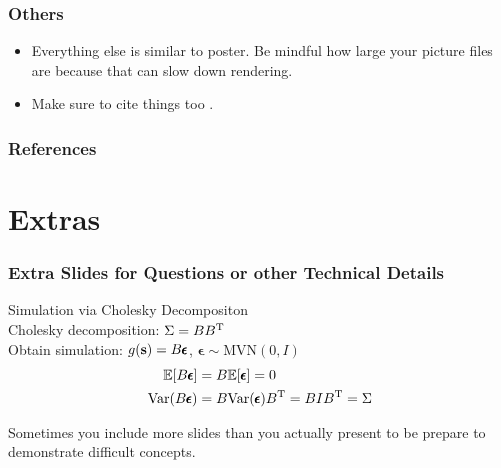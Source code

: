 \documentclass[serif,12pt, aspectratio=169]{beamer}
\begin{document}
\begin{frame}
	\frametitle{Others}
	\begin{itemize}
		\item Everything else is similar to poster. Be mindful how large your picture files are because that can slow down rendering. 
		\item Make sure to cite things too \cite{PlaceHolderSource}.
	\end{itemize}
	
	
	
\end{frame}


\begin{frame}
\frametitle{References}
	\AtNextBibliography{\tiny}
	\printbibliography
\end{frame}

\section*{Extras}
\begin{frame}
	\frametitle{Extra Slides for Questions or other Technical Details}
	Simulation via Cholesky Decompositon \\
	Cholesky decomposition: $\Sigma = BB^{\rm T}$ \\
	Obtain simulation: $g(\mathbf{s}) = B\pmb{\epsilon}$, $\pmb{\epsilon} \sim \text{MVN}(0,I)$
	\begin{align*}
	\mathbb{E}[B\pmb{\epsilon}] &= B \mathbb{E}[\pmb{\epsilon}] = 0 \\
	{\rm Var}(B\pmb{\epsilon}) &= B {\rm Var}(\pmb{\epsilon}) B^{\rm T} = B I B^{\rm T} = \Sigma
	\end{align*} 
	
	Sometimes you include more slides than you actually present to be prepare to demonstrate difficult concepts. 
\end{frame}
\end{document}
